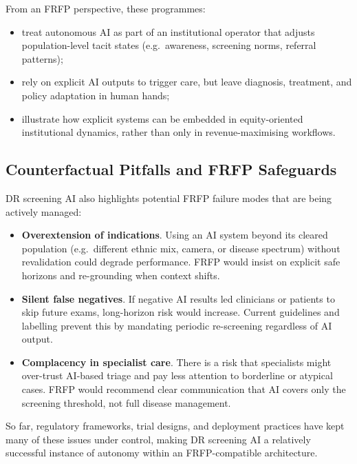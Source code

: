 From an FRFP perspective, these programmes:

\begin{itemize}
  \item treat autonomous AI as part of an institutional operator that
        adjusts population-level tacit states (e.g.\ awareness, screening
        norms, referral patterns);
  \item rely on explicit AI outputs to trigger care, but leave diagnosis,
        treatment, and policy adaptation in human hands;
  \item illustrate how explicit systems can be embedded in equity-oriented
        institutional dynamics, rather than only in revenue-maximising
        workflows.
\end{itemize}

\subsection{Counterfactual Pitfalls and FRFP Safeguards}

DR screening AI also highlights potential FRFP failure modes that are being
actively managed:

\begin{itemize}
  \item \textbf{Overextension of indications}.
        Using an AI system beyond its cleared population (e.g.\ different
        ethnic mix, camera, or disease spectrum) without revalidation could
        degrade performance.
        FRFP would insist on explicit safe horizons and re-grounding when
        context shifts.
  \item \textbf{Silent false negatives}.
        If negative AI results led clinicians or patients to skip future
        exams, long-horizon risk would increase.
        Current guidelines and labelling prevent this by mandating
        periodic re-screening regardless of AI output.
  \item \textbf{Complacency in specialist care}.
        There is a risk that specialists might over-trust AI-based triage
        and pay less attention to borderline or atypical cases.
        FRFP would recommend clear communication that AI covers only the
        screening threshold, not full disease management.
\end{itemize}

So far, regulatory frameworks, trial designs, and deployment practices have
kept many of these issues under control, making DR screening AI a relatively
successful instance of autonomy within an FRFP-compatible architecture.

